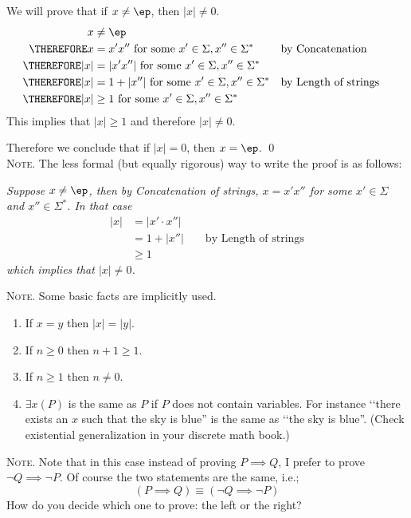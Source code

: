 We will prove that if $x \neq \ep$, then $|x| \neq 0$.
\begin{align*}
x &\neq \ep \\
\THEREFORE x &= x'x'' \text{ for some } x' \in \Sigma, x'' \in \Sigma^*
           & & \text{by Concatenation} \\
\THEREFORE |x| &= |x' x''| \text{ for some } x' \in \Sigma, x'' \in \Sigma^* 
           \\ 
\THEREFORE |x| &= 1 + |x''| \text{ for some } x' \in \Sigma, x'' \in \Sigma^*
           & & \text{by Length of strings} \\
\THEREFORE |x| &\geq 1 \text{ for some } x' \in \Sigma, x'' \in \Sigma^* 
\end{align*}
This implies that $|x| \geq 1$ and therefore $|x| \neq 0$.

Therefore we conclude that if $|x| = 0$, then $x = \ep$. \qed
\\

\textsc{Note.}
The less formal (but equally rigorous) way to write the proof is as follows:

\textit{
Suppose $x \neq \ep$, then by Concatenation of strings, $x = x'x''$ 
for some $x' \in \Sigma$ and $x'' \in \Sigma^*$.
In that case
\begin{align*}
|x| 
&= |x' \cdot x''| \\ 
&= 1 + |x''| & & \text{ by Length of strings}    \\
&\geq 1
\end{align*}
which implies that $|x| \neq 0$.
}

\textsc{Note.}
Some basic facts are implicitly used.
\begin{enumerate}
\item If $x = y$ then $|x|= |y|$. 
\item If $n \geq 0$ then $n + 1 \geq 1$.
\item If $n \geq 1$ then $ n \neq 0$.
\item $\exists x(P)$ is the same as $P$ if
$P$ does not contain variables.
For instance \lq\lq there exists an $x$ such that
the sky is blue'' is the same as
\lq\lq the sky is blue''.
(Check existential generalization in your discrete math book.)
\end{enumerate}

\textsc{Note.}
Note that in this case instead of proving $P \implies Q$,
I prefer to prove $\lnot Q \implies \lnot P$.
Of course the two statements are the same, i.e.;
\[
(P \implies Q) \equiv (\lnot Q \implies \lnot P)
\]
How do you decide which one to prove: the left or the right?

